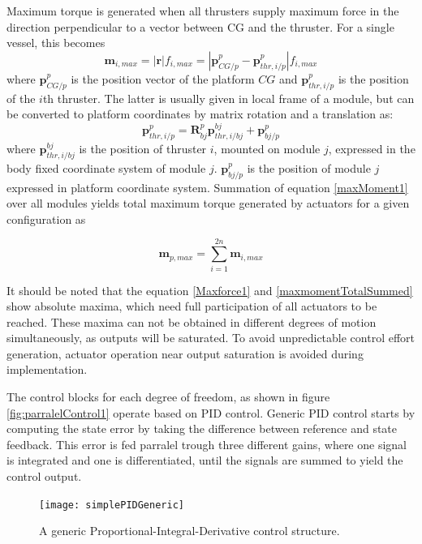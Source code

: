 Maximum torque is generated when all thrusters supply maximum force in the direction perpendicular to a vector between CG and the thruster. For a single vessel, this becomes
\begin{equation}
\textbf{m}_{i,max} = |\textbf{r}|  f_{i,max} =  | \textbf{p}_{CG/p}^{p} - \textbf{p}_{thr,i/p}^{p} |  f_{i,max}
\label{maxMoment1}
\end{equation}
where $ \textbf{p}_{CG/p}^{p} $ is the position vector of the platform $CG$ and $ \textbf{p}_{thr,i/p}^{p}$ is the position of the $i$th thruster. The latter is usually given in local frame of a module, but can be converted to platform coordinates by matrix rotation and a translation as:
\begin{equation}
\textbf{p}_{thr,i/p}^{p} =   \textbf{R}_{bj}^{p} \textbf{p}_{thr,i/bj}^{bj} + \textbf{p}_{bj/p}^{p}
\end{equation}
where $\textbf{p}_{thr,i/bj}^{bj}$ is the position of thruster $i$, mounted on module $j$, expressed in the body fixed coordinate system of module $j$. $\textbf{p}_{bj/p}^{p}$ is the position of module $j$ expressed in platform coordinate system. Summation of equation \ref{maxMoment1} over all modules yields total maximum torque generated by actuators for a given configuration as

\begin{equation}
\textbf{m}_{p,max} = \sum_{i=1}^{2n}  \textbf{m}_{i,max}
\label{maxmomentTotalSummed}
\end{equation}

It should be noted that the  equation \ref{Maxforce1} and \ref{maxmomentTotalSummed} show absolute maxima, which need full participation of all actuators to be reached. These maxima can not be obtained in different degrees of motion simultaneously, as outputs will be saturated. To avoid unpredictable control effort generation, actuator operation near output saturation is avoided during implementation.

The control blocks for each degree of freedom, as shown in figure \ref{fig:parralelControl1} operate based on PID control. Generic PID control starts by computing the state error by taking the difference between reference and state feedback. This error is fed parralel trough three different gains, where one signal is integrated and one is differentiated, until the signals are summed to yield the control output.

\begin{figure}[H]
	\centering
	\captionsetup{justification=centering}
	\texttt{[image: simplePIDGeneric]}
	\caption{A generic Proportional-Integral-Derivative control structure.}
	\label{fig:simplePIDGeneric}
\end{figure}

